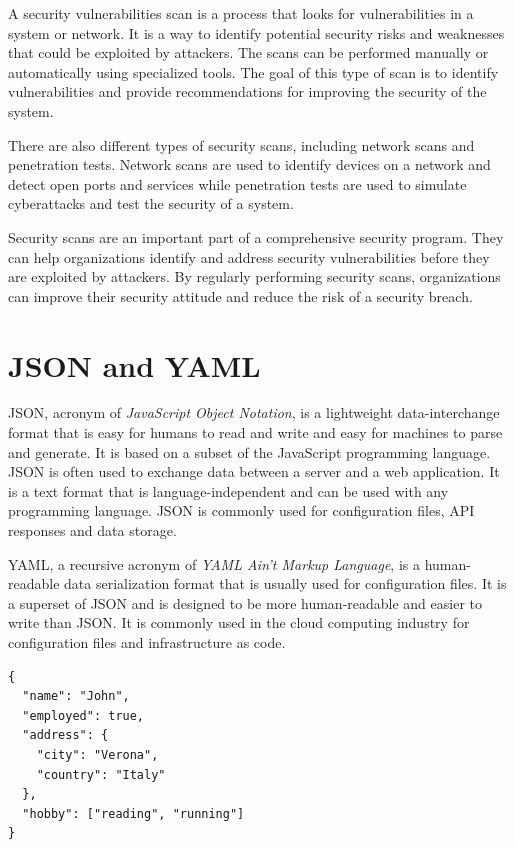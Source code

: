 A security vulnerabilities scan is a process that looks for vulnerabilities in a system or network. It is a way to identify potential security risks and weaknesses that could be exploited by attackers. The scans can be performed manually or automatically using specialized tools. The goal of this type of scan is to identify vulnerabilities and provide recommendations for improving the security of the system.

There are also different types of security scans, including network scans and penetration tests. Network scans are used to identify devices on a network and detect open ports and services while penetration tests are used to simulate cyberattacks and test the security of a system.

Security scans are an important part of a comprehensive security program. They can help organizations identify and address security vulnerabilities before they are exploited by attackers. By regularly performing security scans, organizations can improve their security attitude and reduce the risk of a security breach.

\section{JSON and YAML}

JSON, acronym of \textit{JavaScript Object Notation}, is a lightweight data-interchange format that is easy for humans to read and write and easy for machines to parse and generate. It is based on a subset of the JavaScript programming language. JSON is often used to exchange data between a server and a web application. It is a text format that is language-independent and can be used with any programming language. JSON is commonly used for configuration files, API responses and data storage.

YAML, a recursive acronym of \textit{YAML Ain't Markup Language}, is a human-readable data serialization format that is usually used for configuration files. It is a superset of JSON and is designed to be more human-readable and easier to write than JSON. It is commonly used in the cloud computing industry for configuration files and infrastructure as code.

\noindent\begin{minipage}{\linewidth}
  \vspace{0.5cm}
  \begin{lstlisting}[style=json, caption={JSON example}, label={lst:json-example}]
{
  "name": "John",
  "employed": true,
  "address": {
    "city": "Verona",
    "country": "Italy"
  },
  "hobby": ["reading", "running"]
}
  \end{lstlisting}
\end{minipage}

